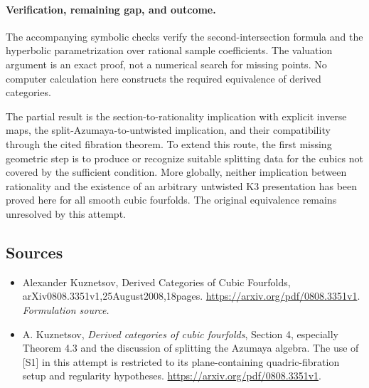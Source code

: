 \documentclass[11pt]{article}
\begin{document}
\paragraph{Verification, remaining gap, and outcome.}
The accompanying symbolic checks verify the second-intersection formula and the hyperbolic parametrization over rational sample coefficients. The valuation argument is an exact proof, not a numerical search for missing points. No computer calculation here constructs the required equivalence of derived categories.

The partial result is the section-to-rationality implication with explicit inverse maps, the split-Azumaya-to-untwisted implication, and their compatibility through the cited fibration theorem. To extend this route, the first missing geometric step is to produce or recognize suitable splitting data for the cubics not covered by the sufficient condition. More globally, neither implication between rationality and the existence of an arbitrary untwisted K3 presentation has been proved here for all smooth cubic fourfolds. The original equivalence remains unresolved by this attempt.

\subsection{Sources}
\begin{itemize}
\item[S1]Alexander Kuznetsov, Derived Categories of Cubic Fourfolds, arXiv0808.3351v1,25August2008,18pages.
\url{https://arxiv.org/pdf/0808.3351v1}.
\textit{Formulation source.}
\item[E1]A. Kuznetsov, \textit{Derived categories of cubic fourfolds}, Section 4, especially Theorem 4.3 and the discussion of splitting the Azumaya algebra. The use of [S1] in this attempt is restricted to its plane-containing quadric-fibration setup and regularity hypotheses.
\url{https://arxiv.org/pdf/0808.3351v1}.

\end{itemize}
\end{document}
